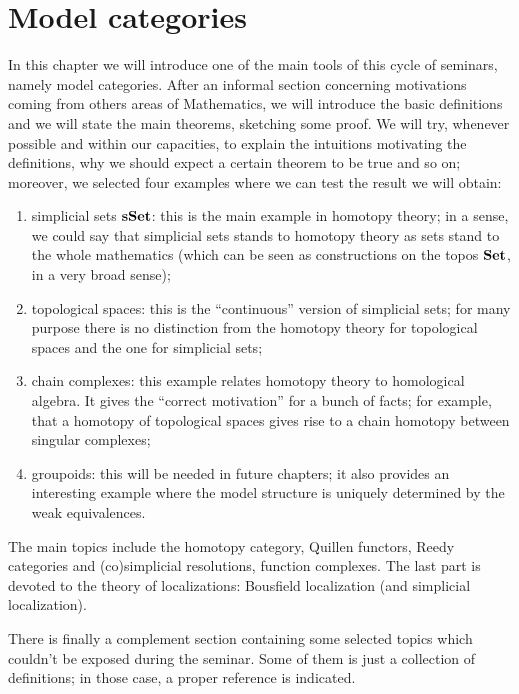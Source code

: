 \chapter{Model categories}

\begin{refsection}

In this chapter we will introduce one of the main tools of this cycle of seminars, namely model categories. After an informal section concerning motivations coming from others areas of Mathematics, we will introduce the basic definitions and we will state the main theorems, sketching some proof. We will try, whenever possible and within our capacities, to explain the intuitions motivating the definitions, why we should expect a certain theorem to be true and so on; moreover, we selected four examples where we can test the result we will obtain:
\begin{enumerate}
\item simplicial sets $\mathbf{s\,\!\mathbf{Set}}$: this is the main example in homotopy theory; in a sense, we could say that simplicial sets stands to homotopy theory as sets stand to the whole mathematics (which can be seen as constructions on the topos $\mathbf{Set}$, in a very broad sense);
\item topological spaces: this is the ``continuous'' version of simplicial sets; for many purpose there is no distinction from the homotopy theory for topological spaces and the one for simplicial sets;
\item chain complexes: this example relates homotopy theory to homological algebra. It gives the ``correct motivation'' for a bunch of facts; for example, that a homotopy of topological spaces gives rise to a chain homotopy between singular complexes;
\item groupoids: this will be needed in future chapters; it also provides an interesting example where the model structure is uniquely determined by the weak equivalences.
\end{enumerate}
The main topics include the homotopy category, Quillen functors, Reedy categories and (co)simplicial resolutions, function complexes. The last part is devoted to the theory of localizations: Bousfield localization (and simplicial localization).

There is finally a complement section containing some selected topics which couldn't be exposed during the seminar. Some of them is just a collection of definitions; in those case, a proper reference is indicated.


\end{refsection}
